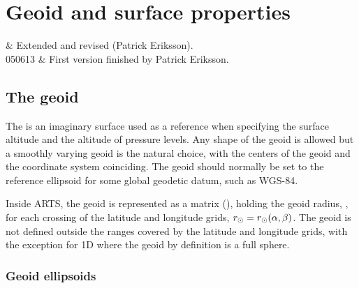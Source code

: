 \chapter{Geoid and surface properties}
 \label{sec:surface}


 & Extended and revised (Patrick Eriksson). \\
  050613 & First version finished by Patrick Eriksson. \\
\stophistory


\graphicspath{{Figs/ppath/}}


\section{The geoid}
\label{sec:fm_defs:geoid}

The  is an imaginary surface used as a
reference when specifying the surface altitude and the altitude
of pressure levels. Any shape of the geoid is allowed but a smoothly
varying geoid is the natural choice, with the centers of the geoid and
the coordinate system coinciding. The geoid should normally be set to
the reference ellipsoid for some global geodetic datum, such as
WGS-84.

Inside ARTS, the geoid is represented as a matrix (),
holding the geoid radius, \aRds{\odot}, for each crossing of the latitude and
longitude grids, $r_{\odot}=r_{\odot}(\alpha,\beta)$. The geoid is not
defined outside the ranges covered by the latitude and longitude grids, with
the exception for 1D where the geoid by definition is a full sphere. 




\subsection{Geoid ellipsoids}
\label{sec:ppath:geoid}

